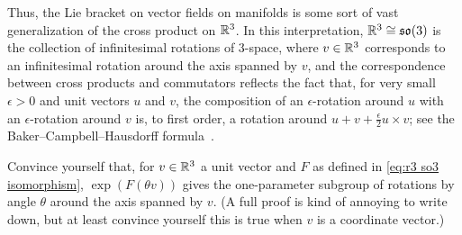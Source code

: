 \begin{example}
	Thus, the Lie bracket on vector fields on manifolds is some sort of vast generalization of the cross product on $\mathbb{R}^3$. In this interpretation, $\mathbb{R}^3 \cong \mathfrak{so}(3)$ is the collection of infinitesimal rotations of 3-space, where $v \in \mathbb{R}^3$ corresponds to an infinitesimal rotation around the axis spanned by $v$, and the correspondence between cross products and commutators reflects the fact that, for very small $\epsilon > 0$ and unit vectors $u$ and $v$, the composition of an $\epsilon$-rotation around $u$ with an $\epsilon$-rotation around $v$ is, to first order, a rotation around $u + v + \frac{\epsilon}{2} u \times v$; see the Baker--Campbell--Hausdorff formula~\cite[Chapter~5]{hallLieGroupsLie2015}.
\end{example}

\begin{exercise}
	Convince yourself that, for $v \in \mathbb{R}^3$ a unit vector and $F$ as defined in \eqref{eq:r3 so3 isomorphism}, $\exp (F(\theta v))$ gives the one-parameter subgroup of rotations by angle $\theta$ around the axis spanned by $v$. (A full proof is kind of annoying to write down, but at least convince yourself this is true when $v$ is a coordinate vector.)
\end{exercise}